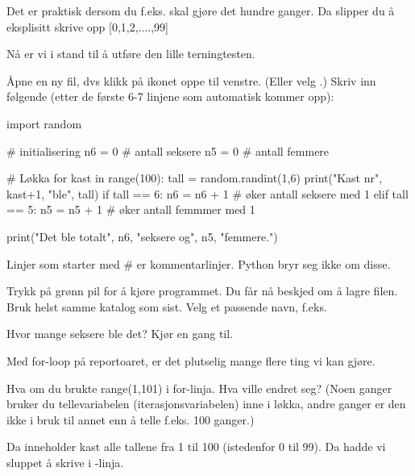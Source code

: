 Det er praktisk dersom du f.eks. skal gjøre det hundre ganger. Da slipper du å eksplisitt skrive opp [0,1,2,....,99]

Nå er vi i stand til å utføre den lille terningtesten. 

Åpne en ny fil, dvs klikk på ikonet oppe til venstre. (Eller velg \usnsubmenusep{}.) Skriv inn følgende (etter de første 6-7 linjene som automatisk kommer opp): 

\begin{usncodebox}
import random

# initialisering
n6 = 0  # antall seksere
n5 = 0  # antall femmere

# Løkka 
for kast in range(100):
    tall = random.randint(1,6)
    print("Kast nr", kast+1, "ble", tall)
    if tall == 6:
       n6 = n6 + 1    # øker antall seksere med 1
    elif tall == 5:
       n5 = n5 + 1    # øker antall femmmer med 1

print("Det ble totalt", n6, "seksere og", n5, "femmere.")
\end{usncodebox}

Linjer som starter med \# er kommentarlinjer. Python bryr seg ikke om disse.

Trykk på grønn pil for å kjøre programmet. Du får nå beskjed om å lagre filen. Bruk helst samme katalog som sist. Velg et passende navn, f.eks. 

Hvor mange seksere ble det? Kjør en gang til.

Med for-loop på reportoaret, er det plutselig mange flere ting vi kan gjøre. 

\begin{exercise}
Hva om du brukte range(1,101) i for-linja. Hva ville endret seg? (Noen ganger bruker du tellevariabelen (iterasjonsvariabelen) inne i løkka, andre ganger er den ikke i bruk til annet enn å telle f.eks. 100 ganger.)
\end{exercise}
\begin{solution}
Da inneholder kast alle tallene fra 1 til 100 (istedenfor 0 til 99). Da hadde vi sluppet å skrive  i -linja.
\end{solution}

